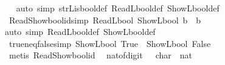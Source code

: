 \begin{isabellebody}
%
\isadelimproof
\ \ %
\endisadelimproof
%
\isatagproof
{}\isamarkupfalse%
{\isacharparenleft}{\kern0pt}auto\ simp{\isacharcolon}{\kern0pt}\ strL{\isacharunderscore}{\kern0pt}is{\isacharunderscore}{\kern0pt}bool{\isacharprime}{\kern0pt}{\isacharunderscore}{\kern0pt}def\ ReadL\isactrlsub b\isactrlsub o\isactrlsub o\isactrlsub l{\isacharunderscore}{\kern0pt}def\ ShowL\isactrlsub b\isactrlsub o\isactrlsub o\isactrlsub l{\isacharunderscore}{\kern0pt}def{\isacharparenright}{\kern0pt}%
\endisatagproof
{\isafoldproof}%
%
\isadelimproof
\isanewline
%
\endisadelimproof
\isanewline
{}\isamarkupfalse%
\ Read{\isacharunderscore}{\kern0pt}Show{\isacharunderscore}{\kern0pt}bool{\isacharprime}{\kern0pt}{\isacharunderscore}{\kern0pt}id{\isacharbrackleft}{\kern0pt}simp{\isacharbrackright}{\kern0pt}{\isacharcolon}{\kern0pt}\ {\isacartoucheopen}ReadL\isactrlsub b\isactrlsub o\isactrlsub o\isactrlsub l\ {\isacharparenleft}{\kern0pt}ShowL\isactrlsub b\isactrlsub o\isactrlsub o\isactrlsub l\ b{\isacharparenright}{\kern0pt}\ {\isacharequal}{\kern0pt}\ b{\isacartoucheclose}\isanewline
%
\isadelimproof
\ \ %
\endisadelimproof
%
\isatagproof
{}\isamarkupfalse%
{\isacharparenleft}{\kern0pt}auto\ simp{\isacharcolon}{\kern0pt}\ ReadL\isactrlsub b\isactrlsub o\isactrlsub o\isactrlsub l{\isacharunderscore}{\kern0pt}def\ ShowL\isactrlsub b\isactrlsub o\isactrlsub o\isactrlsub l{\isacharunderscore}{\kern0pt}def{\isacharparenright}{\kern0pt}%
\endisatagproof
{\isafoldproof}%
%
\isadelimproof
\isanewline
%
\endisadelimproof
\isanewline
{}\isamarkupfalse%
\ true{\isacharunderscore}{\kern0pt}neq{\isacharunderscore}{\kern0pt}false{\isacharbrackleft}{\kern0pt}simp{\isacharbrackright}{\kern0pt}{\isacharcolon}{\kern0pt}\ {\isachardoublequoteopen}ShowL\isactrlsub b\isactrlsub o\isactrlsub o\isactrlsub l\ True\ {\isasymnoteq}\ ShowL\isactrlsub b\isactrlsub o\isactrlsub o\isactrlsub l\ False{\isachardoublequoteclose}\isanewline
%
\isadelimproof
\ \ %
\endisadelimproof
%
\isatagproof
{}\isamarkupfalse%
\ {\isacharparenleft}{\kern0pt}metis\ Read{\isacharunderscore}{\kern0pt}Show{\isacharunderscore}{\kern0pt}bool{\isacharprime}{\kern0pt}{\isacharunderscore}{\kern0pt}id{\isacharparenright}{\kern0pt}%
\endisatagproof
{\isafoldproof}%
%
\isadelimproof
%
\endisadelimproof
%
\isadelimdocument
%
\endisadelimdocument
%
\isatagdocument
%
\isamarkuptrue%
%
\endisatagdocument
{\isafolddocument}%
%
\isadelimdocument
%
\endisadelimdocument
{}\isamarkupfalse%
\ \ nat{\isacharunderscore}{\kern0pt}of{\isacharunderscore}{\kern0pt}digit\ {\isacharcolon}{\kern0pt}{\isacharcolon}{\kern0pt}\ \ {\isacartoucheopen}char\ {\isasymRightarrow}\ nat{\isacartoucheclose}\ \isanewline

\end{isabellebody}
